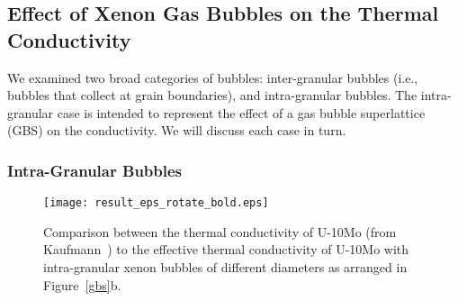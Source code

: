 \subsection{Effect of Xenon Gas Bubbles on the Thermal Conductivity} 
\label{subsec:xenonbubble}
We examined two broad categories of bubbles: inter-granular bubbles (i.e.,
bubbles that collect at grain boundaries), and intra-granular bubbles.
The intra-granular case is intended to represent the effect of a gas bubble
superlattice (GBS) on the conductivity. We will discuss each case in turn.

\subsubsection{Intra-Granular Bubbles}
\begin{figure}%
\centering
\texttt{[image: result\_eps\_rotate\_bold.eps]}
\caption{Comparison between the thermal conductivity of U-10Mo (from Kaufmann~\cite{kaufmann1962nuclear}) to the effective thermal conductivity of U-10Mo with intra-granular xenon bubbles of different diameters as arranged in Figure~\ref{gbs}b.}
\label{fig_result_intra}
\end{figure}

